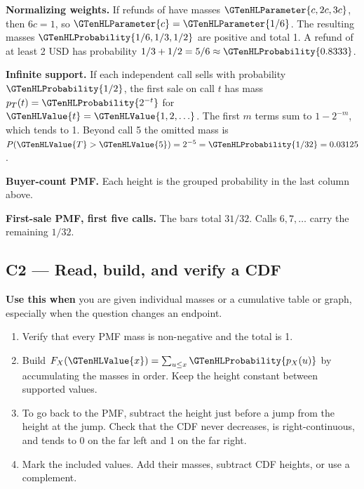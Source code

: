 \textbf{Normalizing weights.} If refunds of  have masses \(\GTenHLParameter{c,2c,3c}\), then \(6c=1\), so \(\GTenHLParameter{c}=\GTenHLParameter{1/6}\). The resulting masses \(\GTenHLProbability{1/6,1/3,1/2}\) are positive and total 1. A refund of at least 2 USD has probability \(1/3+1/2=5/6\approx\GTenHLProbability{0.8333}\).

\textbf{Infinite support.} If each independent call sells with probability \(\GTenHLProbability{1/2}\), the first sale on call \(t\) has mass \(p_T(t)=\GTenHLProbability{2^{-t}}\) for \(\GTenHLValue{t}=\GTenHLValue{1,2,\ldots}\). The first \(m\) terms sum to \(1-2^{-m}\), which tends to 1. Beyond call 5 the omitted mass is \(P(\GTenHLValue{T}>\GTenHLValue{5})=2^{-5}=\GTenHLProbability{1/32}=0.03125\).

\noindent
\begin{minipage}[t]{.48\linewidth}
\centering
{}
\par\small \textbf{Buyer-count PMF.} Each height is the grouped probability in the last column above.
\end{minipage}\hfill
\begin{minipage}[t]{.48\linewidth}
\centering
{}
\par\small \textbf{First-sale PMF, first five calls.} The bars total \(31/32\). Calls \(6,7,\ldots\) carry the remaining \(1/32\).
\end{minipage}
\par\nobreak\vspace{6pt}

\newpage
\subsection{C2 --- Read, build, and verify a CDF}\label{crit:C2}
\textbf{Use this when} you are given individual masses or a cumulative table or graph, especially when the question changes an endpoint.

\begin{enumerate}
\item Verify that every PMF mass is non-negative and the total is 1.
\item Build \(F_X(\GTenHLValue{x})=\sum_{u\leq x}\GTenHLProbability{p_X(u)}\) by accumulating the masses in order. Keep the height constant between supported values.
\item To go back to the PMF, subtract the height just before a jump from the height at the jump. Check that the CDF never decreases, is right-continuous, and tends to 0 on the far left and 1 on the far right.
\item Mark the included values. Add their masses, subtract CDF heights, or use a complement.
\end{enumerate}

